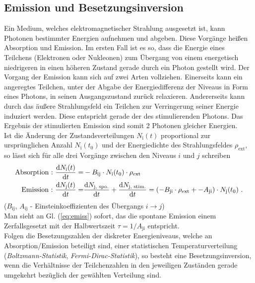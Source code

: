 \documentclass[numbers=noenddot,12pt,a4paper]{scrartcl}
\newcommand{\diff}{\textnormal{d}}
\newcommand{\ix}[1]{_\text{#1}}
\newcommand{\tilt}[1]{\mbox{\textit{#1}}}
\begin{document}
\subsection{Emission und Besetzungsinversion}\label{subsec:besetzinv}
Ein Medium, welches elektromagnetischer Strahlung ausgesetzt ist, kann Photonen bestimmter Energien aufnehmen und abgeben. Diese Vorgänge heißen Absorption und Emission. Im ersten Fall ist es so, dass die Energie eines Teilchens (Elektronen oder Nukleonen) zum Übergang von einem energetisch niedrigeren in einen höheren Zustand gerade durch ein Photon gestellt wird. Der Vorgang der Emission kann sich auf zwei Arten vollziehen. Einerseits kann ein angeregtes Teilchen, unter der Abgabe der Energiedifferenz der Niveaus in Form eines Photons, in seinen Ausgangszustand zurück relaxieren. Andererseits kann durch das äußere Strahlungsfeld ein Teilchen zur Verringerung seiner Energie induziert werden. Diese entspricht gerade der des stimulierenden Photons. Das Ergebnis der stimulierten Emission sind somit 2 Photonen gleicher Energien.\\
Ist die Änderung der Zustandsverteilungen $N\ix{i}(t)$ proportional zur ursprünglichen Anzahl $N\ix{i}(t\ix{0})$ und der Energiedichte des Strahlungsfeldes $\rho\ix{ext}$, so lässt sich für alle drei Vorgänge zwischen den Niveaus $i$ und $j$ schreiben
\begin{align}
	\text{Absorption :} \,\, \frac{\diff N\ix{i}(t)}{\diff t}=&-B\ix{ij}\cdot N\ix{i}(t\ix{0})\cdot \rho\ix{ext} \label{eq:absorp}\\
	\text{Emission :} \,\, \frac{\diff N\ix{j}(t)}{\diff t}=&\frac{\diff N\ix{j, spo.}}{\diff t}+\frac{\diff N\ix{j, stim.}}{\diff t}=\left(-B\ix{ji}\cdot \rho\ix{ext}+-A\ix{ji}\right)\cdot N\ix{j}(t\ix{0}) \label{eq:emiss} \,\,.
\end{align}
($B\ix{ij}$, $A\ix{ij}$ - Einsteinkoeffizienten des Übergangs $i\rightarrow j$) \\
Man sieht an Gl. (\ref{eq:emiss}) sofort, das die spontane Emission einem Zerfallsgesetzt mit der Halbwertszeit $\tau=1/A\ix{ji}$ entspricht.\\
Folgen die Besetzungszahlen der diskreter Energieniveaus, welche an Absorption/Emission beteiligt sind, einer statistischen Temperaturverteilung\\ (\tilt{Boltzmann-Statistik}, \tilt{Fermi-Dirac-Statistik}), so besteht eine Besetzungsinversion, wenn die Verhältnisse der Teilchenzahlen in den jeweiligen Zuständen gerade umgekehrt bezüglich der gewählten Verteilung sind.\\
\end{document}
